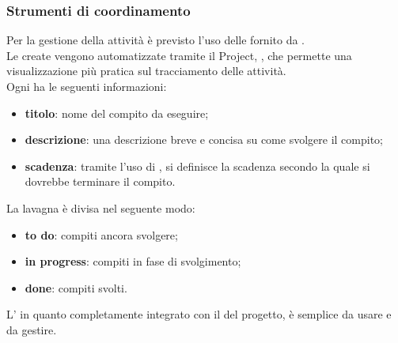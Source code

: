 		 \subsubsection{Strumenti di coordinamento}
		 Per la gestione della attività è previsto l'uso delle  fornito da . \\
		 Le  create vengono automatizzate tramite il Project, , che permette una visualizzazione più pratica sul tracciamento delle attività. \\
		 Ogni  ha le seguenti informazioni:
		 \begin{itemize}
		 	\item {\bfseries titolo}: nome del compito da eseguire;
		 	\item {\bfseries descrizione}: una descrizione breve e concisa su come svolgere il compito;
		 	\item {\bfseries scadenza}: tramite l'uso di , si definisce la scadenza secondo la quale si dovrebbe terminare il compito.
		 \end{itemize}
		 La lavagna è divisa nel seguente modo:
		 \begin{itemize}
		 	\item {\bfseries to do}: compiti ancora svolgere;
		 	\item {\bfseries in progress}: compiti in fase di svolgimento;
		 	\item {\bfseries done}: compiti svolti.	
		 	\end{itemize}
	 	L' in quanto completamente integrato con il  del progetto, è semplice da usare e da gestire.
